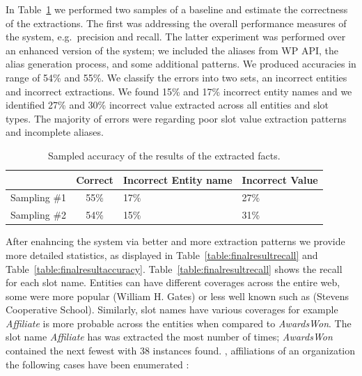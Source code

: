 \documentclass[letterpaper]{article}
\begin{document}
In Table~\ref{table:initialresult} we performed two samples of a baseline and estimate the correctness of the extractions.
The first was addressing the overall performance measures of the system, e.g.\ precision and recall.
The latter experiment was performed over an enhanced version of the system; we included the aliases from WP API, the alias generation process, and some additional patterns. 
We produced accuracies in range of  54\% and 55\%.
We classify the errors into two sets, an incorrect entities and incorrect extractions.
We found 15\% and 17\% incorrect entity names and we identified 27\% and 30\% incorrect value extracted across all entities and slot types.
The majority of errors were regarding poor slot value extraction patterns and incomplete aliases.

\begin{table}
\caption{Sampled accuracy of the results of the extracted facts.}
\centering
\label{table:initialresult}

\begin{tabular}{| c | c | p{2cm} | p{13mm} |}
\hline 
 & \textbf{Correct} & \textbf{Incorrect Entity name} & \textbf{Incorrect Value} \\ 
\hline 
Sampling \#1 & 55\% & 17\% & 27\% \\ 
\hline Sampling \#2 & 54\% & 15\% & 31\%  \\ 
\hline 
\end{tabular} 
\end{table}


After enahncing the system via better and more extraction patterns  we provide more detailed statistics, as displayed in Table~\ref{table:finalresultrecall} and Table~\ref{table:finalresultaccuracy}.
Table~\ref{table:finalresultrecall} shows the recall for each slot name. 
Entities can have different coverages across the entire web, some were more popular (William H. Gates) or less well known such as (Stevens Cooperative School).
Similarly, slot names have various coverages for example \textit{Affiliate} is more probable across the entities when compared to \textit{AwardsWon}. %
The slot name \textit{Affiliate} has was extracted the most number of times; \textit{AwardsWon} contained the next fewest with 38 instances found. 
,  affiliations of an organization the following cases have been enumerated \cite{tackbp}: 
\end{document}
